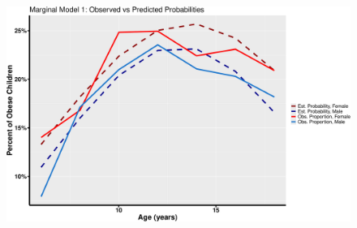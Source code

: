 \documentclass[
  letterpaper,
  DIV=11,
  numbers=noendperiod]{scrreprt}
\begin{document}
\begin{figure}[H]

{\centering \includegraphics{Longi_noncontinuous_files/figure-pdf/unnamed-chunk-16-1.pdf}

}

\end{figure}
\end{document}

